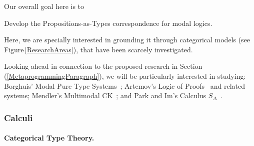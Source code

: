 \documentclass[11pt,twocolumn]{article}
\newcounter{CC}
\newenvironment{resenumerate}
  {\begin{list}{[\textbf{\arabic{CC}]}}
  {\usecounter{CC}
   \setlength{\topsep}{2pt}
   \setlength{\partopsep}{2pt}
   \setlength{\itemsep}{2.5pt}
   \setlength{\parsep}{2.5pt}
   \setlength{\leftmargin}{1.65em}
   \setlength{\labelwidth}{1.15em}
 }}
  {\end{list}}
\newcommand{\hide}[1]{}
\newcommand{\hidenote}{\hide}
\newcommand{\pref}[1]{\,(\ref{#1})}
\newcommand{\eg}{\emph{eg.}}
\begin{document}
Our overall goal here is to
\begin{resenumerate}\setcounter{CC}{1}
\item
  Develop the Propositions-as-Types correspondence for modal logics.
\end{resenumerate}
Here, we are specially interested in grounding it through categorical models
(see Figure\,\ref{ResearchAreas}), that have been scarcely investigated.

Looking ahead in connection to the proposed research in
Section\pref{MetaprogrammingParagraph}, we will be particularly interested
in studying: 
%
Borghuis' Modal Pure Type Systems~\cite{ModalPTS};
%
Artemov's Logic of Proofs~\cite{ArtemovLP} and related systems;
%
Mendler's Multimodal CK~\cite{MendlerMMCK};
and
%
Park and Im's Calculus $S_\Delta$~\cite{ParkIm}.

\subsubsection{Calculi}
\label{CalculiSubsection}

\hidenote{\ldots}

\setcounter{paragraph}{0}
\paragraph*{Categorical Type Theory.}
\end{document}
